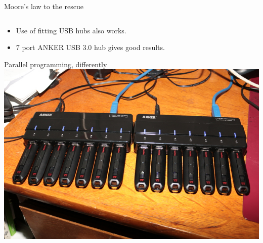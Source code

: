 \begin{frame}{Moore's law to the rescue}
\begin{columns}
\begin{column}[c]{.35\textwidth}
    \end{column}
  \end{columns}
  \begin{itemize}
  \item Use of fitting USB hubs also works.
  \item 7 port ANKER USB 3.0 hub gives good results. 
  \end{itemize}
\end{frame}

\begin{frame}{Parallel programming, differently}
\includegraphics[width=\textwidth]{figures/14usbsticks.jpg}

\end{frame}

